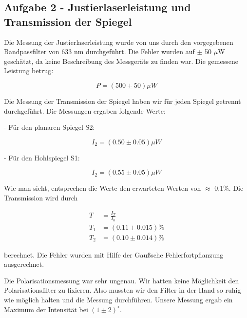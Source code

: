 \subsection{Aufgabe 2 - Justierlaserleistung und Transmission der Spiegel}

Die Messung der Justierlaserleistung wurde von uns durch den vorgegebenen Bandpassfilter von 633 nm durchgeführt. Die Fehler wurden auf $\pm$ 50 $\mu$W geschätzt, da keine Beschreibung des Messgeräts zu finden war. Die gemessene Leistung betrug:

\begin{equation}
P = (500 \pm 50) \mu W
\end{equation}

Die Messung der Transmission der Spiegel haben wir für jeden Spiegel getrennt durchgeführt. Die Messungen ergaben folgende Werte:

- Für den planaren Spiegel S2:

\begin{equation}
I_{2} = (0.50 \pm 0.05) \mu W
\end{equation}

- Für den Hohlspiegel S1:

\begin{equation}
	I_{2} = (0.55 \pm 0.05) \mu W
\end{equation}

Wie man sieht, entsprechen die Werte den erwarteten Werten von $\approx$ 0,1\%. Die Transmission wird durch 

\begin{align}
	T &= \frac{I_{T}}{I_{0}} \\
	T_{1} &= (0.11 \pm 0.015)\% \\
	T_{2} &= (0.10 \pm 0.014)\% 
\end{align}

berechnet. Die Fehler wurden mit Hilfe der Gaußsche Fehlerfortpflanzung ausgerechnet.

Die Polarisationsmessung war sehr ungenau. Wir hatten keine Möglichkeit den Polarisationsfilter zu fixieren. Also mussten wir den Filter in der Hand so ruhig wie möglich halten und die Messung durchführen. Unsere Messung ergab ein Maximum der Intensität bei $(1 \pm 2)^{\circ}$.

